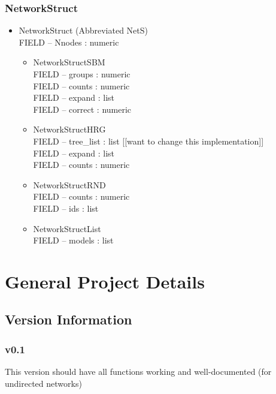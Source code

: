 \documentclass[11pt]{article}
\begin{document}
\subsubsection{NetworkStruct}
\begin{itemize}

\item NetworkStruct (Abbreviated NetS)\\
FIELD -- Nnodes : numeric
\begin{itemize}
\item NetworkStructSBM\\
FIELD -- groups : numeric\\
FIELD -- counts : numeric\\
FIELD -- expand : list\\
FIELD -- correct : numeric\\
\item NetworkStructHRG\\
FIELD -- tree\_list : list [[want to change this implementation]] \\
FIELD -- expand : list\\
FIELD -- counts : numeric\\
\item NetworkStructRND\\
FIELD -- counts : numeric\\
FIELD -- ids : list\\
\item NetworkStructList\\
FIELD -- models : list\\
\end{itemize}
\end{itemize}









\pagebreak
\section{General Project Details}
\subsection{Version Information}
\subsubsection{v0.1}
This version should have all functions working and well-documented
(for undirected networks)
\end{document}
